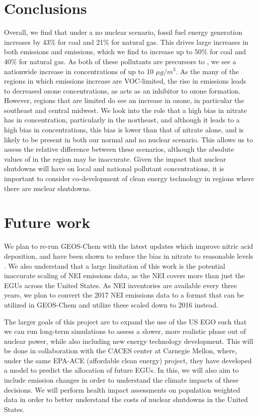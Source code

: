 \documentclass[12]{article}
\begin{document}
\section{Conclusions}
Overall, we find that under a no nuclear scenario, fossil fuel energy generation increases by 43\% for coal and 21\% for natural gas. This drives large increases in both  emissions and  emissions, which we find to increase up to 50\% for coal and 40\% for natural gas. As both of these pollutants are precursors to , we see a nationwide increase in  concentrations of up to 10 $\mu g/m^3$. As the many of the regions in which emissions increase are VOC-limited, the rise in  emissions leads to decreased ozone concentrations, as  acts as an inhibitor to ozone formation. However, regions that are  limited do see an increase in ozone, in particular the southeast and central midwest. We look into the role that a high bias in nitrate has in   concentration, particularly in the northeast, and although it leads to a high bias in   concentrations, this bias is lower than that of nitrate alone, and is likely to be present in both our normal and no nuclear scenario. This allows us to assess the relative difference between these scenarios, although the absolute values of  in the region may be inaccurate. Given the impact that nuclear shutdowns will have on local and national pollutant concentrations, it is important to consider co-development of clean energy technology in regions where there are nuclear shutdowns.

\section{Future work}
We plan to re-run GEOS-Chem with the latest updates which improve nitric acid deposition, and have been shown to reduce the bias in nitrate to reasonable levels \citep{luo_revised_2019}. We also understand that a large limitation of this work is the potential inaccurate scaling of NEI emissions data, as the NEI covers more than just the EGUs across the United States. As NEI inventories are available every three years, we plan to convert the 2017 NEI emissions data to a format that can be utilized in GEOS-Chem and utilize these scaled down to 2016 instead. 

The larger goals of this project are to expand the use of the US EGO such that we can run long-term simulations to assess a slower, more realistic phase out of nuclear power, while also including new energy technology development. This will be done in collaboration with the CACES center at Carnegie Mellon, where, under the same EPA-ACE (affordable clean energy) project, they have developed a model to predict the allocation of future EGUs. In this, we will also aim to include  emission changes in order to understand the climate impacts of these decisions. We will perform health impact assessments on population weighted data in order to better understand the costs of nuclear shutdowns in the United States.


\pagebreak


\end{document}
